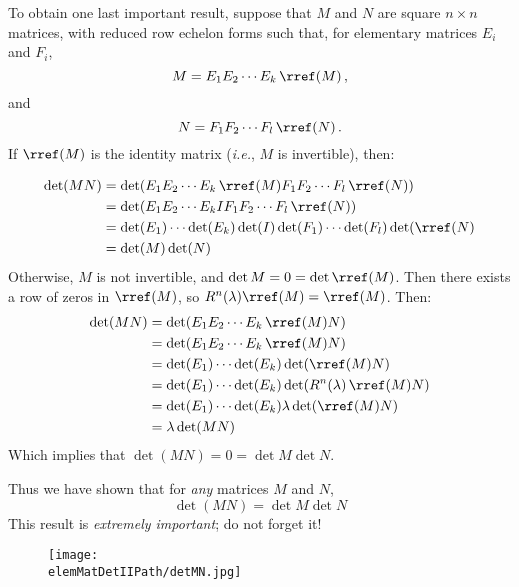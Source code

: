 To obtain one last important result, suppose that $M$ and $N$ are square $n\times n$ matrices, with reduced row echelon forms such that, for elementary matrices  $E_i$ and $F_i$, \[M=E_1E_2\cdots E_k \, \rref(M)\, ,\] and  \[N=F_1F_2\cdots F_l \, \rref(N)\, .\]  If $\rref(M)$ is the identity matrix ({\itshape i.e.}, $M$ is invertible), then:

\begin{align*}
\det (MN) & = \det (E_1E_2\cdots E_k\,  \rref(M) F_1F_2\cdots F_l \, \rref(N) )\\
& = \det (E_1E_2\cdots E_k I F_1F_2\cdots F_l\,  \rref(N) )\\
& = \det (E_1) \cdots \det(E_k)\det(I)\det(F_1)\cdots\det(F_l)\det(\rref(N)\\
& = \det(M)\det(N)
\end{align*}
Otherwise, $M$ is not invertible, and $\det M=0=\det 
\rref(M)$.  Then there exists a row of zeros in $
\rref(M)$, so $R^n(\lambda)
\rref(M)=
\rref(M)$.  Then:
\begin{align*}
\det (MN)
& = \det (E_1E_2\cdots E_k \, \rref(M) N )\\
& = \det (E_1E_2\cdots E_k \, \rref(M) N )\\
& = \det (E_1) \cdots \det(E_k)\det( \rref(M)N)\\
& = \det (E_1) \cdots \det(E_k)\det( R^n(\lambda) \, \rref(M)N)\\
& = \det (E_1) \cdots \det(E_k)\lambda \det( \rref(M)N)\\
& = \lambda \det (MN)
\end{align*}
Which implies that $\det (MN)=0=\det M \det N$.

Thus we have shown that for {\itshape any} matrices $M$ and $N$, 
\label{detmultiplicative}
\[
\det (MN) = \det M \det N
\]
This result is {\itshape extremely important}; do not forget it!


\begin{figure}
\begin{center}
\texttt{[image: \\elemMatDetIIPath/detMN.jpg]}
\end{center}
\end{figure}



